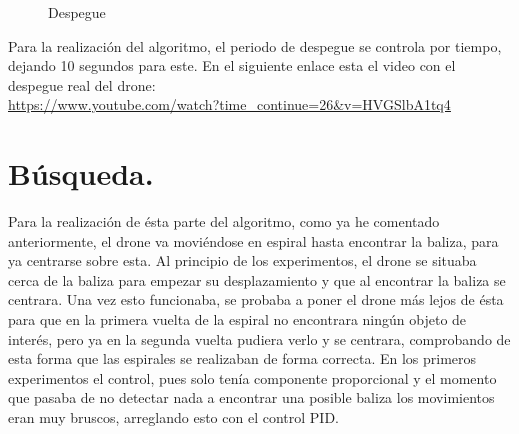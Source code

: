 \begin{figure}[H]
 \centering
 \caption{Despegue}
 \label{f:Test Despegue}
\end{figure}

Para la realizaci\'on del algoritmo, el periodo de despegue se controla por tiempo, dejando 10 segundos para este. 
En el siguiente enlace esta el video con el despegue real del drone:\\
\underline{\url{https://www.youtube.com/watch?time_continue=26&v=HVGSlbA1tq4}}

\section{B\'usqueda. } Para la realizaci\'on de \'esta parte del algoritmo, como ya he comentado anteriormente, el drone va movi\'endose en espiral hasta encontrar la baliza, para ya centrarse sobre esta. Al principio de los experimentos, el drone se situaba cerca de la baliza para empezar su desplazamiento y que al encontrar la baliza se centrara. Una vez esto funcionaba, se probaba a poner el drone m\'as lejos de \'esta para que en la primera vuelta de la espiral no encontrara ning\'un objeto de inter\'es, pero ya en la segunda vuelta pudiera verlo y se centrara, comprobando de esta forma que las espirales se realizaban de forma correcta. En los primeros experimentos el control, pues solo ten\'ia componente proporcional y el momento que pasaba de no detectar nada a encontrar una posible baliza los movimientos eran muy bruscos, arreglando esto con el control PID. 

